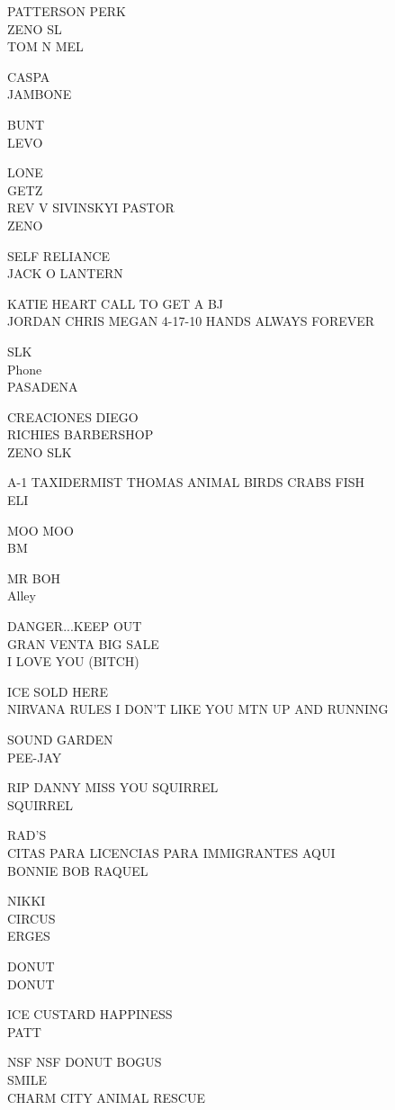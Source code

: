 \documentclass[10pt,letterpaper]{article}
\begin{document}
PATTERSON PERK\\
ZENO SL\\
TOM N MEL

CASPA\\
JAMBONE

BUNT\\
LEVO

LONE\\
GETZ\\
REV V SIVINSKYI PASTOR\\
ZENO

SELF RELIANCE\\
JACK O LANTERN

KATIE HEART CALL TO GET A BJ\\
JORDAN CHRIS MEGAN 4{-}17{-}10 HANDS ALWAYS FOREVER

SLK\\
Phone\\
PASADENA

CREACIONES DIEGO\\
RICHIES BARBERSHOP\\
ZENO SLK

A{-}1 TAXIDERMIST THOMAS ANIMAL BIRDS CRABS FISH\\
ELI

MOO MOO\\
BM

MR BOH\\
Alley

DANGER...KEEP OUT\\
GRAN VENTA BIG SALE\\
I LOVE YOU (BITCH)

ICE SOLD HERE\\
NIRVANA RULES I DON'T LIKE YOU MTN UP AND RUNNING

SOUND GARDEN\\
PEE{-}JAY

RIP DANNY MISS YOU SQUIRREL\\
SQUIRREL

RAD'S\\
CITAS PARA LICENCIAS PARA IMMIGRANTES AQUI\\
BONNIE BOB RAQUEL

NIKKI\\
CIRCUS\\
ERGES

DONUT\\
DONUT

ICE CUSTARD HAPPINESS\\
PATT

NSF NSF DONUT BOGUS\\
SMILE\\
CHARM CITY ANIMAL RESCUE
\end{document}
